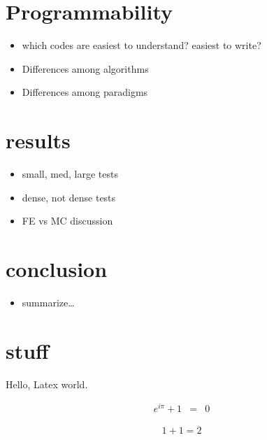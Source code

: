 \documentclass[letterpaper]{article}
\begin{document}
\section{Programmability}

\begin{itemize}
    \item which codes are easiest to understand? easiest to write?
    \item Differences among algorithms
    \item Differences among paradigms
\end{itemize}

\section{results}

\begin{itemize}
    \item small, med, large tests
    \item dense, not dense tests
    \item FE vs MC discussion
\end{itemize}

\section{conclusion}
\begin{itemize}
    \item summarize\dots
\end{itemize}

\section{stuff}

Hello, Latex world.

\begin{eqnarray}
    \label{eqn:euler}
    e^{i\pi} + 1 &=& 0
\end{eqnarray}

\begin{eqnarray}
    \label{eqn:simple}
    1 + 1 = 2
\end{eqnarray}
\end{document}
